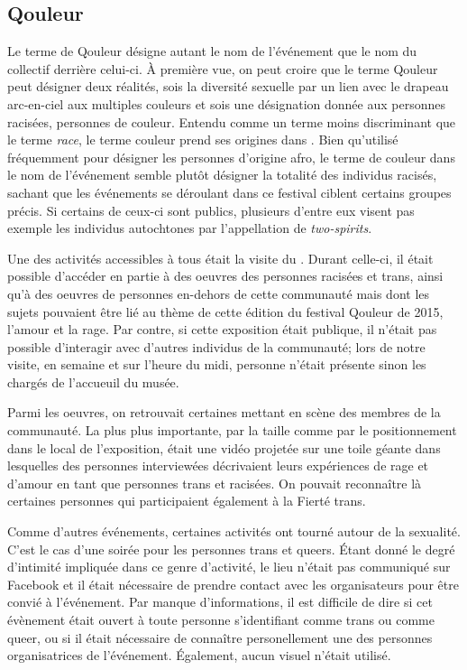 \subsection{Qouleur}
\label{subsec:qouleur}
Le terme de Qouleur désigne autant le nom de l'événement que le nom du collectif derrière celui-ci.
À première vue, on peut croire que le terme Qouleur peut désigner deux réalités, sois la diversité sexuelle par un lien avec le drapeau arc-en-ciel aux multiples couleurs et sois une désignation donnée aux personnes racisées, personnes de couleur.
Entendu comme un terme moins discriminant que le terme \emph{race}, le terme couleur prend ses origines dans .
Bien qu'utilisé fréquemment pour désigner les personnes d'origine afro, le terme de couleur dans le nom de l'événement semble plutôt désigner la totalité des individus racisés, sachant que les événements se déroulant dans ce festival ciblent certains groupes précis.
Si certains de ceux-ci sont publics, plusieurs d'entre eux visent pas exemple les individus autochtones par l'appellation de \emph{two-spirits}.

Une des activités accessibles à tous était la visite du \mai{}.
Durant celle-ci, il était possible d'accéder en partie à des oeuvres des personnes racisées et trans, ainsi qu'à des oeuvres de personnes en-dehors de cette communauté mais dont les sujets pouvaient être lié au thème de cette édition du festival Qouleur de 2015, l'amour et la rage.
Par contre, si cette exposition était publique, il n'était pas possible d'interagir avec d'autres individus de la communauté; lors de notre visite, en semaine et sur l'heure du midi, personne n'était présente sinon les chargés de l'accueuil du musée.

Parmi les oeuvres, on retrouvait certaines mettant en scène des membres de la communauté.
La plus plus importante, par la taille comme par le positionnement dans le local de l'exposition, était une vidéo projetée sur une toile géante dans lesquelles des personnes interviewées décrivaient leurs expériences de rage et d'amour en tant que personnes trans et racisées.
On pouvait reconnaître là certaines personnes qui participaient également à la Fierté trans.

Comme d'autres événements, certaines activités ont tourné autour de la sexualité.
C'est le cas d'une soirée \bdsm{} pour les personnes trans et queers.
Étant donné le degré d'intimité impliquée dans ce genre d'activité, le lieu n'était pas communiqué sur Facebook et il était nécessaire de prendre contact avec les organisateurs pour être convié à l'événement.
Par manque d'informations, il est difficile de dire si cet évènement était ouvert à toute personne s'identifiant comme trans ou comme queer, ou si il était nécessaire de connaître personellement une des personnes organisatrices de l'événement.
Également, aucun visuel n'était utilisé.


